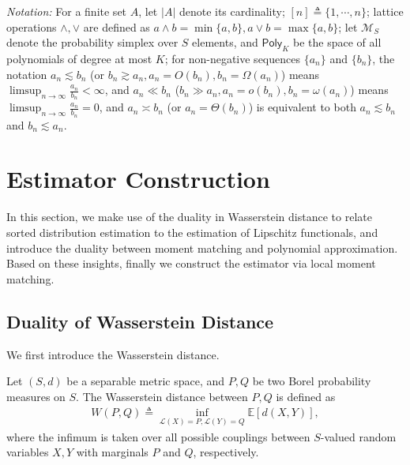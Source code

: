\documentclass[final,12pt]{colt2018} %
\def \cL {\mathcal{L}}
\newcommand{\calM}{{\mathcal{M}}}
\begin{document}
%



\emph{Notation: } For a finite set $A$, let $|A|$ denote its cardinality; $[n]\triangleq \{1,\cdots,n\}$; lattice operations $\wedge, \vee$ are defined as $a\wedge b=\min\{a,b\}, a\vee b=\max\{a,b\}$; let $\calM_S$ denote the probability simplex over $S$ elements, and $\mathsf{Poly}_K$ be the space of all polynomials of degree at most $K$; for non-negative sequences $\{a_n\}$ and $\{b_n\}$, the notation $a_n\lesssim b_n$ (or $b_n\gtrsim a_n, a_n=O(b_n), b_n=\Omega(a_n)$) means $\limsup_{n\to\infty} \frac{a_n}{b_n}<\infty$, and $a_n\ll b_n$ ($b_n\gg a_n, a_n=o(b_n), b_n=\omega(a_n)$) means $\limsup_{n\to\infty}\frac{a_n}{b_n}=0$, and $a_n\asymp b_n$ (or $a_n=\Theta(b_n)$) is equivalent to both $a_n\lesssim b_n$ and $b_n\lesssim a_n$.


\section{Estimator Construction}\label{sec.construction}
In this section, we make use of the duality in Wasserstein distance to relate sorted distribution estimation to the estimation of Lipschitz functionals, and introduce the duality between moment matching and polynomial approximation. Based on these insights, finally we construct the estimator via local moment matching.
\subsection{Duality of Wasserstein Distance}
We first introduce the Wasserstein distance. 
\begin{definition}
	Let $(S,d)$ be a separable metric space, and $P,Q$ be two Borel probability measures on $S$. The Wasserstein distance between $P,Q$ is defined as
	\begin{align*}
	W(P,Q) \triangleq \inf_{\cL(X)=P, \cL(Y)=Q} \mathbb{E}[ d(X,Y)],
	\end{align*}
	where the infimum is taken over all possible couplings between $S$-valued random variables $X,Y$ with marginals $P$ and $Q$, respectively.
\end{definition}
\end{document}
